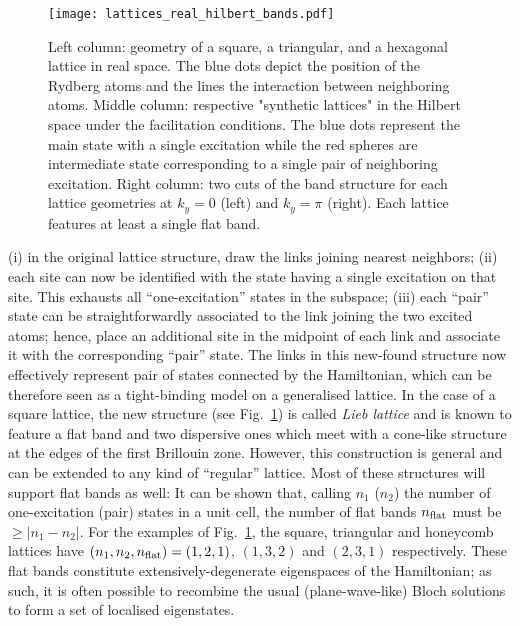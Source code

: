 \documentclass[prl,aps,twocolumn,showpacs,superscriptaddress,longbibliography]{revtex4-1}
\newcommand{\abs}[1]{\left| #1 \right|}
\begin{document}
\begin{figure}
\texttt{[image: lattices\_real\_hilbert\_bands.pdf]}
\caption{Left column: geometry of a square, a triangular, and a hexagonal lattice in real space. The blue dots depict the position of the Rydberg atoms and the lines the interaction between neighboring atoms. Middle column: respective "synthetic lattices" in the Hilbert space under the facilitation conditions. The blue dots represent the main state with a single excitation while the red spheres are intermediate state corresponding to a single pair of neighboring excitation. Right column: two cuts of the band structure for each lattice geometries at $k_y= 0$ (left) and $k_y = \pi$ (right). Each lattice features at least a single flat band.}
\label{Fig:flat_band_lattices}
\end{figure}
(i) in the original lattice structure, draw the links joining nearest neighbors; (ii) each site can now be identified with the state having a single excitation on that site. This exhausts all ``one-excitation'' states in the subspace; (iii) each ``pair'' state can be straightforwardly associated to the link joining the two excited atoms; hence, place an additional site in the midpoint of each link and associate it with the corresponding ``pair'' state. The links in this new-found structure now effectively represent pair of states connected by the Hamiltonian, which can be therefore seen as a tight-binding model on a generalised lattice. In the case of a square lattice, the new structure (see Fig.~\ref{Fig:flat_band_lattices}) is called \emph{Lieb lattice} and is known to feature a flat band and two dispersive ones which meet with a cone-like structure at the edges of the first Brillouin zone. However, this construction is general and can be extended to any kind of ``regular'' lattice. Most of these structures will support flat bands as well: It can be shown \cite{SM} that, calling $n_1$ ($n_2$) the number of one-excitation (pair) states in a unit cell, the number of flat bands $n_{\rm flat}$ must be $\geq \abs{n_1 - n_2}$. For the examples of Fig.~\ref{Fig:flat_band_lattices}, the square, triangular and honeycomb lattices have $(n_1,n_2,n_{\rm flat}) = (1,2,1)$, $(1,3,2)$ and $(2,3,1)$ respectively. These flat bands constitute extensively-degenerate eigenspaces of the Hamiltonian; as such, it is often possible to recombine the usual (plane-wave-like) Bloch solutions to form a set of localised eigenstates.
\end{document}
